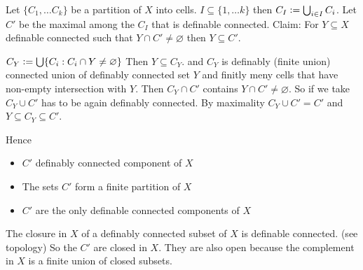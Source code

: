 {
    Let $\{C_1, \dots C_k\}$ be a partition of $X$ into cells. $I\subseteq \{1,\dots k\}$ then
    $C_I \vcentcolon= \bigcup_{i\in I}C_i$. 
    Let $C'$ be the maximal among the $C_I$ that is definable connected.
    Claim: For $Y\subseteq X$ definable connected such that $Y\cap C'\neq \varnothing$ then $Y\subseteq C'$.
    \begin{claimproof}
        $C_Y \vcentcolon= \bigcup \{C_i : C_i\cap Y \neq \varnothing\}$
        Then $Y\subseteq C_Y$. and $C_Y$ is definably (finite union) connected union of definably connected set $Y$ and finitly meny cells that have non-empty intersection with $Y$.
        Then $C_Y\cap C'$ contains $Y\cap C'\neq \varnothing$. So if we take $C_Y \cup C'$ has to be again definably connected. By maximality $C_Y \cup C'= C'$ and $Y\subseteq C_Y \subseteq C'$.
    \end{claimproof}
    Hence 
    \begin{itemize}
        \item $C'$ definably connected component of $X$
        \item The sets $C'$ form a finite partition of $X$
        \item $C'$ are the only definable connected components of $X$
    \end{itemize}
    The closure in $X$ of a definably connected subset of $X$ is definable connected. (see topology)
    So the $C'$ are closed in $X$. 
    They are also open because the complement in $X$ is a finite union of closed subsets.
}

